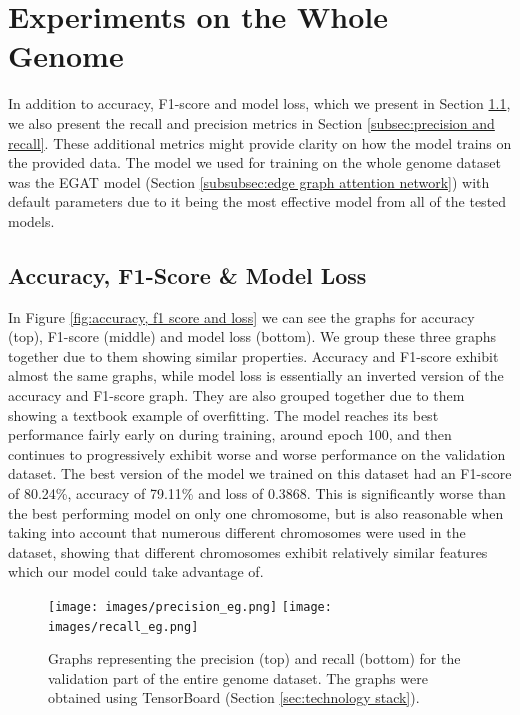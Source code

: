 \documentclass[times, utf8, diplomski, english]{fer_eng}
\begin{document}
\section{Experiments on the Whole Genome}
\label{sec:experiments on the whole genome}

In addition to accuracy, F1-score and model loss, which we present in Section \ref{subsec:accuracy, f1-score and model loss}, we also present the recall and precision metrics in Section \ref{subsec:precision and recall}. These additional metrics might provide clarity on how the model trains on the provided data. The model we used for training on the whole genome dataset was the EGAT model (Section \ref{subsubsec:edge graph attention network}) with default parameters due to it being the most effective model from all of the tested models.

\subsection{Accuracy, F1-Score \& Model Loss}
\label{subsec:accuracy, f1-score and model loss}

In Figure \ref{fig:accuracy, f1 score and loss} we can see the graphs for accuracy (top), F1-score (middle) and model loss (bottom). We group these three graphs together due to them showing similar properties. Accuracy and F1-score exhibit almost the same graphs, while model loss is essentially an inverted version of the accuracy and F1-score graph. They are also grouped together due to them showing a textbook example of overfitting. The model reaches its best performance fairly early on during training, around epoch 100, and then continues to progressively exhibit worse and worse performance on the validation dataset. The best version of the model we trained on this dataset had an F1-score of 80.24\%, accuracy of 79.11\% and loss of 0.3868. This is significantly worse than the best performing model on only one chromosome, but is also reasonable when taking into account that numerous different chromosomes were used in the dataset, showing that different chromosomes exhibit relatively similar features which our model could take advantage of.

\begin{figure}[h]
	\centering
	\texttt{[image: images/precision\_eg.png]}
	\texttt{[image: images/recall\_eg.png]}
	\caption[Precision and recall graph]{Graphs representing the precision (top) and recall (bottom) for the validation part of the entire genome dataset. The graphs were obtained using TensorBoard (Section \ref{sec:technology stack}).}
	\label{fig:precision and recall}
\end{figure}
\end{document}
